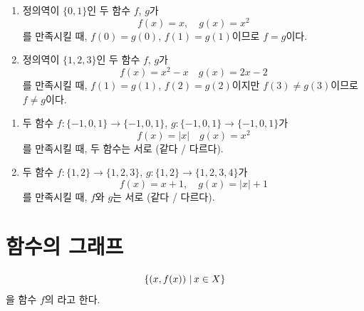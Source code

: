 \documentclass{oblivoir}
\begin{document}
%
\exam{}
\begin{enumerate}\label{function9}
\item
정의역이 \(\{0,1\}\)인 두 함수 \(f\), \(g\)가
\[f(x)=x,\quad g(x)=x^2\]
를 만족시킬 때, \(f(0)=g(0)\), \(f(1)=g(1)\)이므로 \(f=g\)이다.
\item
정의역이 \(\{1,2,3\}\)인 두 함수 \(f\), \(g\)가
\[f(x)=x^2-x\quad g(x)=2x-2\]
를 만족시킬 때, \(f(1)=g(1)\), \(f(2)=g(2)\)이지만 \(f(3)\neq g(3)\)이므로 \(f\neq g\)이다.
\end{enumerate}

%
\prob{}
\begin{enumerate}\label{function10}
\item
두 함수 \(f:\{-1,0,1\}\to\{-1,0,1\}\), \(g:\{-1,0,1\}\to\{-1,0,1\}\)가
\[f(x)=|x|\quad g(x)=x^2\]
를 만족시킬 때, 두 함수는 서로 (같다 / 다르다).
\item
두 함수 \(f:\{1,2\}\to\{1,2,3\}\), \(g:\{1,2\}\to\{1,2,3,4\}\)가
\[f(x)=x+1,\quad g(x)=|x|+1\]를 만족시킬 때, \(f\)와 \(g\)는
서로 (같다 / 다르다).
\end{enumerate}



\section{함수의 그래프}

\begin{mdframed}
%
\label{graph1}
\[\left\{\left(x,f(x)\right)\,|\, x\in X\right\}\]
을 함수 \(f\)의 라고 한다.
\end{mdframed}
\end{document}
